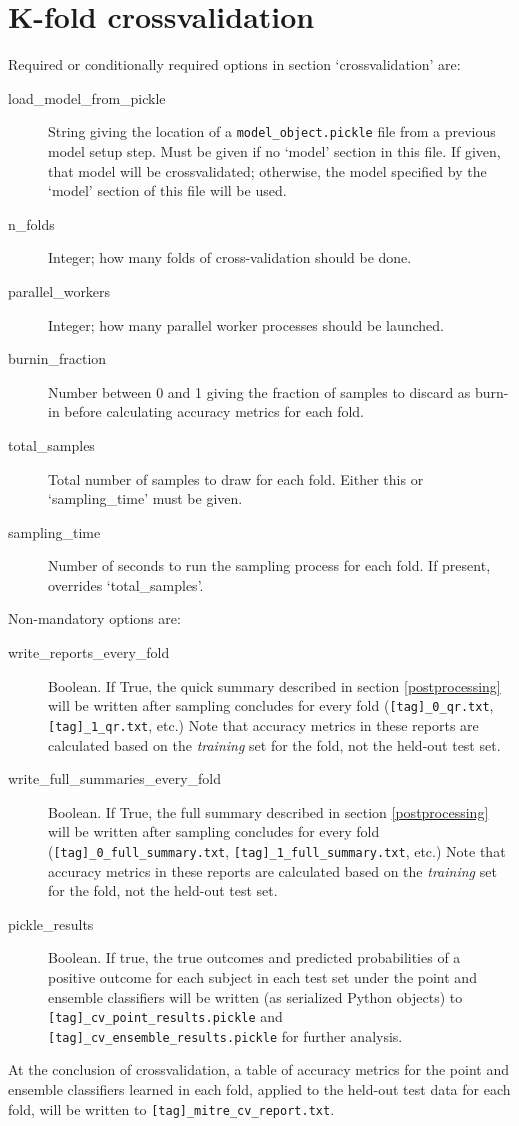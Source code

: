 \documentclass[12pt]{report}
\begin{document}
\section{K-fold crossvalidation}\label{crossvalidation}
Required or conditionally required options in section `crossvalidation' are:
\begin{description}
\item[load\_model\_from\_pickle] String giving the location of a
  \texttt{model\_object.pickle} file from a previous model setup
  step. Must be given if no `model' section in this file. If given,
  that model will be crossvalidated; otherwise, the model specified by
  the `model' section of this file will be used.
\item[n\_folds] Integer; how many folds of cross-validation should be
  done.
\item[parallel\_workers] Integer; how many parallel worker processes
  should be launched.
\item[burnin\_fraction] Number between 0 and 1 giving the fraction of
  samples to discard as burn-in before calculating accuracy metrics
  for each fold.
\item[total\_samples] Total number of samples to draw for each
  fold. Either this or `sampling\_time' must be given.
\item[sampling\_time] Number of seconds to run the sampling process
  for each fold. If present, overrides `total\_samples'.
\end{description}

Non-mandatory options are:
\begin{description}
\item[write\_reports\_every\_fold] Boolean. If True, the quick summary
  described in section \ref{postprocessing} will be written after
  sampling concludes for every fold (\texttt{[tag]\_0\_qr.txt},
  \texttt{[tag]\_1\_qr.txt}, etc.) Note that accuracy metrics in these
  reports are calculated based on the \textit{training} set for the fold,
  not the held-out test set.
\item[write\_full\_summaries\_every\_fold] Boolean. If True, the full
  summary described in section \ref{postprocessing} will be written
  after sampling concludes for every fold
  (\texttt{[tag]\_0\_full\_summary.txt},
  \texttt{[tag]\_1\_full\_summary.txt}, etc.) Note that accuracy
  metrics in these reports are calculated based on the
  \textit{training} set for the fold, not the held-out test set.
\item[pickle\_results] Boolean. If true, the true outcomes and
  predicted probabilities of a positive outcome for each subject in
  each test set under the point and ensemble classifiers will be
  written (as serialized Python objects) to
  \texttt{[tag]\_cv\_point\_results.pickle} and
  \texttt{[tag]\_cv\_ensemble\_results.pickle} for further analysis.
\end{description}
At the conclusion of crossvalidation, a table of accuracy metrics for
the point and ensemble classifiers learned in each fold, applied to
the held-out test data for each fold, will be written to
\texttt{[tag]\_mitre\_cv\_report.txt}.
\end{document}
